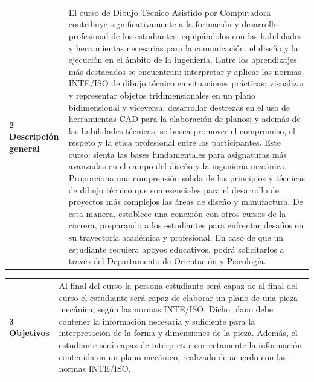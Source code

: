 \documentclass[letterpaper]{article}%
\begin{document}
\begin{tabularx}{\textwidth}{>{\raggedright}p{}p{}}%
\par\fontsize{12}{0}\selectfont \textbf{\textcolor{parte}{2 Descripción general}}&El curso de Dibujo Técnico Asistido por Computadora contribuye significativamente a la formación y desarrollo profesional de los estudiantes, equipándolos con las habilidades y herramientas necesarias para la comunicación, el diseño y la ejecución en el ámbito de la ingeniería.\newline%
Entre los aprendizajes más destacados se encuentran:  interpretar y aplicar las normas INTE/ISO de dibujo técnico en situaciones prácticas; visualizar y representar objetos tridimensionales en un plano bidimensional y viceversa; desarrollar destrezas en el uso de herramientas CAD para la elaboración de planos; y además de las habilidades técnicas, se busca promover el compromiso, el respeto y la ética profesional entre los participantes.​\newline%
Este curso: sienta las bases fundamentales para asignaturas más avanzadas en el campo del diseño y la ingeniería mecánica. Proporciona una comprensión sólida de los principios y técnicas de dibujo técnico que son esenciales para el desarrollo de proyectos más complejos las áreas de diseño y manufactura. De esta manera, establece una conexión con otros cursos de la carrera, preparando a los estudiantes para enfrentar desafíos en su trayectoria académica y profesional.​\newline%
En caso de que un estudiante requiera apoyos educativos, podrá solicitarlos a través del Departamento de Orientación y Psicología.\\%
\end{tabularx}%
\begin{tabularx}{\textwidth}{>{\raggedright}p{}p{}}%
\par\fontsize{12}{0}\selectfont \textbf{\textcolor{parte}{3 Objetivos}}&Al final del curso la persona estudiante será capaz de al final del curso el estudiante será capaz de elaborar un plano de una pieza mecánica, según las normas INTE/ISO. Dicho plano debe contener la información necesaria y suficiente para la interpretación de la forma y dimensiones de la pieza. Además, el estudiante será capaz de interpretar correctamente la información contenida en un plano mecánico, realizado de acuerdo con las normas INTE/ISO.\\%
\end{tabularx}%
\end{document}
